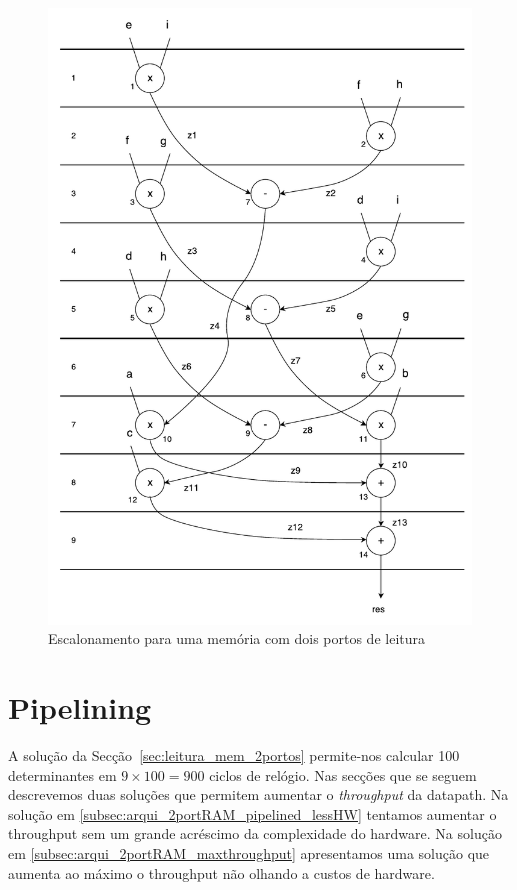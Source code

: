 \documentclass[a4paper]{article}
\begin{document}
\begin{figure}[h]
	\centering
	\includegraphics[width=\linewidth]{scheduling_2portRAM_basic}
	\caption{Escalonamento para uma memória com dois portos de leitura}
	\label{fig:scheduling_2portRAM_basic}
\end{figure}

\section{Pipelining}

A solução da Secção~\ref{sec:leitura_mem_2portos} permite-nos calcular 100 determinantes em $ 9 \times 100 = 900 $ ciclos de relógio. Nas secções que se seguem descrevemos duas soluções que permitem aumentar o \textit{throughput} da datapath. Na solução em \ref{subsec:arqui_2portRAM_pipelined_lessHW} tentamos aumentar o throughput sem um grande acréscimo da complexidade do hardware. Na solução em \ref{subsec:arqui_2portRAM_maxthroughput} apresentamos uma solução que aumenta ao máximo o throughput não olhando a custos de hardware.
\end{document}

